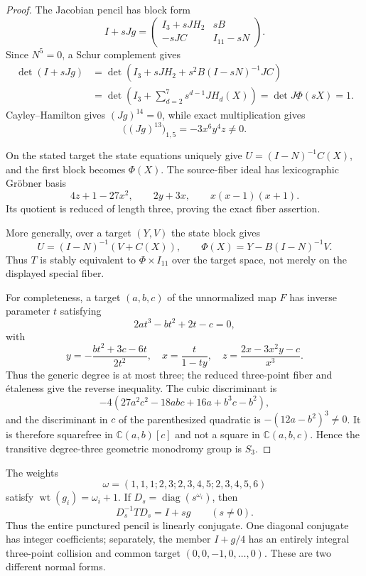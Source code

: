 \documentclass[11pt]{article}
\newcommand{\C}{\mathbb C}
\begin{document}
\begin{proof}
The Jacobian pencil has block form
\[
 I+sJg=
 \begin{pmatrix}
 I_3+sJH_2&sB\\
 -sJC&I_{11}-sN
 \end{pmatrix}.
\]
Since $N^5=0$, a Schur complement gives
\begin{align*}
\det(I+sJg)
 &=\det\!\left(I_3+sJH_2+s^2B(I-sN)^{-1}JC\right)\\
 &=\det\!\left(I_3+\sum_{d=2}^7s^{d-1}JH_d(X)\right)
 =\det J\Phi(sX)=1.
\end{align*}
Cayley--Hamilton gives $(Jg)^{14}=0$, while exact multiplication gives
\[
 \bigl((Jg)^{13}\bigr)_{1,5}=-3x^6y^4z\ne0.
\]

On the stated target the state equations uniquely give
$U=(I-N)^{-1}C(X)$, and the first block becomes $\Phi(X)$.  The source-fiber
ideal has lexicographic Gr\"obner basis
\begin{equation}
 4z+1-27x^2,\qquad 2y+3x,\qquad x(x-1)(x+1).
 \label{eq:fiberbasis}
\end{equation}
Its quotient is reduced of length three, proving the exact fiber assertion.

More generally, over a target $(Y,V)$ the state block gives
\[
 U=(I-N)^{-1}(V+C(X)),\qquad
 \Phi(X)=Y-B(I-N)^{-1}V.
\]
Thus $T$ is stably equivalent to $\Phi\times I_{11}$ over the target space,
not merely on the displayed special fiber.

For completeness, a target $(a,b,c)$ of the unnormalized map $F$ has inverse
parameter $t$ satisfying
\[
 2at^3-bt^2+2t-c=0,
\]
with
\[
 y=-\frac{bt^2+3c-6t}{2t^2},\quad
 x=\frac{t}{1-ty},\quad
 z=\frac{2x-3x^2y-c}{x^3}.
\]
Thus the generic degree is at most three; the reduced three-point fiber and
\'{e}taleness give the reverse inequality.  The cubic discriminant is
\[
 -4(27a^2c^2-18abc+16a+b^3c-b^2),
\]
and the discriminant in $c$ of the parenthesized quadratic is
$-(12a-b^2)^3\ne0$.  It is therefore squarefree in $\C(a,b)[c]$ and
not a square in $\C(a,b,c)$.  Hence the transitive degree-three geometric
monodromy group is $S_3$.
\end{proof}

The weights
\begin{equation}
 \omega=(1,1,1;2,3;2,3,4,5;2,3,4,5,6)
 \label{eq:weights}
\end{equation}
satisfy $\operatorname{wt}(g_i)=\omega_i+1$.  If
$D_s=\operatorname{diag}(s^{\omega_i})$, then
\begin{equation}
 D_s^{-1}TD_s=I+sg\qquad(s\ne0).
 \label{eq:conjugacy}
\end{equation}
Thus the entire punctured pencil is linearly conjugate.  One diagonal
conjugate has integer coefficients; separately, the member $I+g/4$ has an
entirely integral three-point collision and common target $(0,0,-1,0,\ldots,0)$.
These are two different normal forms.
\end{document}
